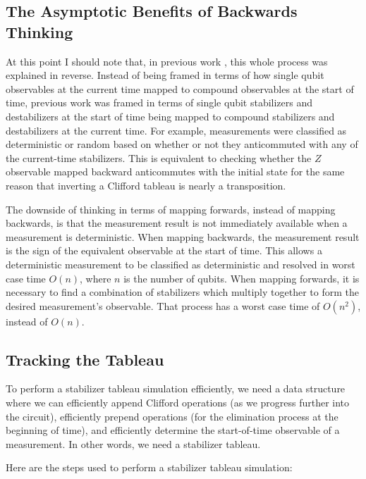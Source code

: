 \documentclass[onecolumn,unpublished]{quantumarticle}
\theoremstyle{definition}
\theoremstyle{definition}
\theoremstyle{definition}
\begin{document}
\subsection{The Asymptotic Benefits of Backwards Thinking}

At this point I should note that, in previous work \cite{aaronson2004chp}, this whole process was explained in reverse.
Instead of being framed in terms of how single qubit observables at the current time mapped to compound observables at the start of time, previous work was framed in terms of single qubit stabilizers and destabilizers at the start of time being mapped to compound stabilizers and destabilizers at the current time.
For example, measurements were classified as deterministic or random based on whether or not they anticommuted with any of the current-time stabilizers.
This is equivalent to checking whether the $Z$ observable mapped backward anticommutes with the initial state for the same reason that inverting a Clifford tableau is nearly a transposition.

The downside of thinking in terms of mapping forwards, instead of mapping backwards, is that the measurement result is not immediately available when a measurement is deterministic.
When mapping backwards, the measurement result is the sign of the equivalent observable at the start of time.
This allows a deterministic measurement to be classified as deterministic and resolved in worst case time $O(n)$, where $n$ is the number of qubits.
When mapping forwards, it is necessary to find a combination of stabilizers which multiply together to form the desired measurement's observable.
That process has a worst case time of $O(n^2)$, instead of $O(n)$.

\subsection{Tracking the Tableau}

To perform a stabilizer tableau simulation efficiently, we need a data structure where we can efficiently append Clifford operations (as we progress further into the circuit), efficiently prepend operations (for the elimination process at the beginning of time), and efficiently determine the start-of-time observable of a measurement.
In other words, we need a stabilizer tableau.

Here are the steps used to perform a stabilizer tableau simulation:
\end{document}

